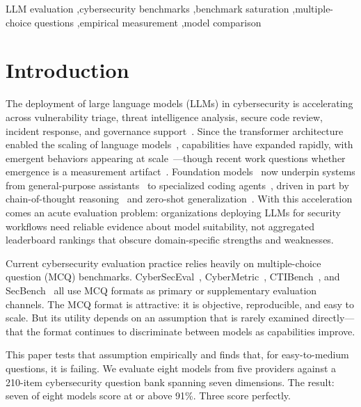 \documentclass[final]{elsarticle}
\begin{document}
\begin{keyword}
LLM evaluation \sep cybersecurity benchmarks \sep benchmark saturation \sep multiple-choice questions \sep empirical measurement \sep model comparison
\end{keyword}

\section{Introduction}

The deployment of large language models (LLMs) in cybersecurity is accelerating across vulnerability triage, threat intelligence analysis, secure code review, incident response, and governance support~\cite{zhang2024llmcyber}. Since the transformer architecture~\cite{vaswani2017attention} enabled the scaling of language models~\cite{brown2020language,kaplan2020scaling,hoffmann2022training}, capabilities have expanded rapidly, with emergent behaviors appearing at scale~\cite{wei2022emergent}---though recent work questions whether emergence is a measurement artifact~\cite{schaeffer2024emergent}. Foundation models~\cite{bommasani2021opportunities} now underpin systems from general-purpose assistants~\cite{openai2023gpt4,geminiteam2023,deepseek2024} to specialized coding agents~\cite{nijkamp2023codegen,roziere2023code}, driven in part by chain-of-thought reasoning~\cite{wei2022chain} and zero-shot generalization~\cite{kojima2022zero}. With this acceleration comes an acute evaluation problem: organizations deploying LLMs for security workflows need reliable evidence about model suitability, not aggregated leaderboard rankings that obscure domain-specific strengths and weaknesses.

Current cybersecurity evaluation practice relies heavily on multiple-choice question (MCQ) benchmarks. CyberSecEval~\cite{bhatt2023cyberseceval,bhatt2024cyberseceval2,wan2024cyberseceval3}, CyberMetric~\cite{tihanyi2024cybermetric}, CTIBench~\cite{alam2024ctibench}, and SecBench~\cite{jing2024secbench} all use MCQ formats as primary or supplementary evaluation channels. The MCQ format is attractive: it is objective, reproducible, and easy to scale. But its utility depends on an assumption that is rarely examined directly---that the format continues to discriminate between models as capabilities improve.

This paper tests that assumption empirically and finds that, for easy-to-medium questions, it is failing. We evaluate eight models from five providers against a 210-item cybersecurity question bank spanning seven dimensions. The result: seven of eight models score at or above 91\%. Three score perfectly.
\end{document}
